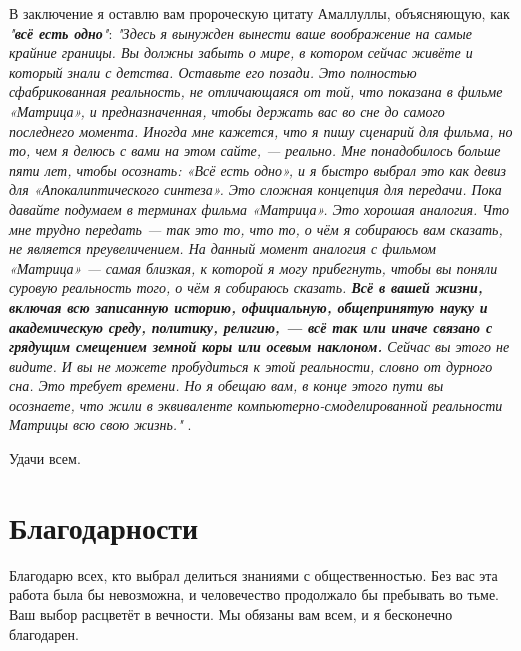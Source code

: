 \documentclass[10pt,twocolumn,letterpaper]{article}
\begin{document}
В заключение я оставлю вам пророческую цитату Амаллуллы, объясняющую, как \textit{"\textbf{всё есть одно}"}: \textit{"Здесь я вынужден вынести ваше воображение на самые крайние границы. Вы должны забыть о мире, в котором сейчас живёте и который знали с детства. Оставьте его позади. Это полностью сфабрикованная реальность, не отличающаяся от той, что показана в фильме «Матрица», и предназначенная, чтобы держать вас во сне до самого последнего момента. Иногда мне кажется, что я пишу сценарий для фильма, но то, чем я делюсь с вами на этом сайте, — реально. Мне понадобилось больше пяти лет, чтобы осознать: «Всё есть одно», и я быстро выбрал это как девиз для «Апокалиптического синтеза». Это сложная концепция для передачи. Пока давайте подумаем в терминах фильма «Матрица». Это хорошая аналогия. Что мне трудно передать — так это то, что то, о чём я собираюсь вам сказать, не является преувеличением. На данный момент аналогия с фильмом «Матрица» — самая близкая, к которой я могу прибегнуть, чтобы вы поняли суровую реальность того, о чём я собираюсь сказать. \textbf{Всё в вашей жизни, включая всю записанную историю, официальную, общепринятую науку и академическую среду, политику, религию, — всё так или иначе связано с грядущим смещением земной коры или осевым наклоном.} Сейчас вы этого не видите. И вы не можете пробудиться к этой реальности, словно от дурного сна. Это требует времени. Но я обещаю вам, в конце этого пути вы осознаете, что жили в эквиваленте компьютерно-смоделированной реальности Матрицы всю свою жизнь."} \cite{33,34}.

Удачи всем.

\section{Благодарности}

Благодарю всех, кто выбрал делиться знаниями с общественностью. Без вас эта работа была бы невозможна, и человечество продолжало бы пребывать во тьме. Ваш выбор расцветёт в вечности. Мы обязаны вам всем, и я бесконечно благодарен.

\clearpage
\twocolumn

{\small
\renewcommand{\refname}{Ссылки}


}
\end{document}

